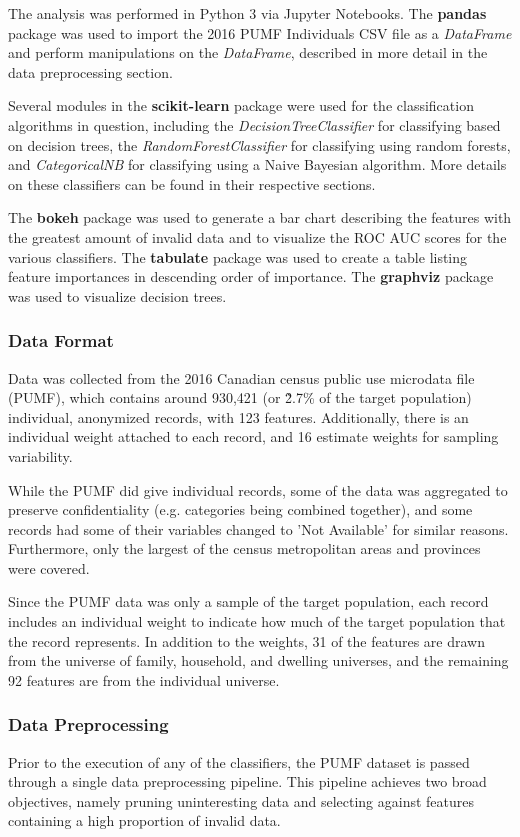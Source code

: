 \documentclass[10pt, conference, compsocconf]{IEEEtran}
\begin{document}
The analysis was performed in Python 3 via Jupyter Notebooks.  
The \textbf{pandas} package was used to import the 2016 PUMF Individuals CSV file as a \textit{DataFrame} and perform manipulations on the \textit{DataFrame}, described in more detail in the data preprocessing section.

Several modules in the \textbf{scikit-learn} package were used for the classification algorithms in question, including the \textit{DecisionTreeClassifier} for classifying based on decision trees, the \textit{RandomForestClassifier} for classifying using random forests, and \textit{CategoricalNB} for classifying using a Naive Bayesian algorithm. More details on these classifiers can be found in their respective sections.

The \textbf{bokeh} package was used to generate a bar chart describing the features with the greatest amount of invalid data and to visualize the ROC AUC scores for the various classifiers. The \textbf{tabulate} package was used to create a table listing feature importances in descending order of importance. The \textbf{graphviz} package was used to visualize decision trees.

\subsubsection{Data Format}
Data was collected from the 2016 Canadian census public use microdata file (PUMF), which contains around 930,421 (or \~2.7\% of the target population) individual, anonymized records, with 123 features. Additionally, there is an individual weight attached to each record, and 16 estimate weights for sampling variability.

While the PUMF did give individual records, some of the data was aggregated to preserve confidentiality (e.g. categories being combined together), and some records had some of their variables changed to 'Not Available' for similar reasons. Furthermore, only the largest of the census metropolitan areas and provinces were covered. 

Since the PUMF data was only a sample of the target population, each record includes an individual weight to indicate how much of the target population that the record represents. In addition to the weights, 31 of the features are drawn from the universe of family, household, and dwelling universes, and the remaining 92 features are from the individual universe.

\subsubsection{Data Preprocessing}
Prior to the execution of any of the classifiers, the PUMF dataset is passed through a single data preprocessing pipeline.  This pipeline achieves two broad objectives, namely pruning uninteresting data and selecting against features containing a high proportion of invalid data.
\end{document}
